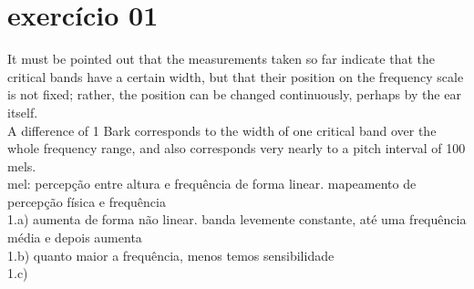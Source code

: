 \documentclass{article}
\begin{document}
\section{exercício 01}
It must be pointed out that the measurements taken so far indicate that the critical bands have a certain width, but that their position on the frequency scale is not fixed; rather, the position can be changed continuously, perhaps by the ear itself.\\
A difference of 1 Bark corresponds to the width of one critical band over the whole frequency range, and also corresponds very nearly to a pitch interval of 100 mels.\\
mel: percepção entre altura e frequência de forma linear. mapeamento de percepção física e frequência\\
1.a) aumenta de forma não linear. banda levemente constante, até uma frequência média e depois aumenta\\
1.b) quanto maior a frequência, menos temos sensibilidade\\
1.c)
\end{document}

